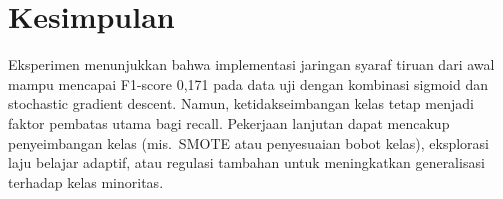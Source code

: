 \documentclass[12pt]{article}
\begin{document}
 
\section*{Kesimpulan}
Eksperimen menunjukkan bahwa implementasi jaringan syaraf tiruan dari awal mampu mencapai F1-score 0,171 pada data uji dengan kombinasi sigmoid dan stochastic gradient descent. Namun, ketidakseimbangan kelas tetap menjadi faktor pembatas utama bagi recall. Pekerjaan lanjutan dapat mencakup penyeimbangan kelas (mis.~SMOTE atau penyesuaian bobot kelas), eksplorasi laju belajar adaptif, atau regulasi tambahan untuk meningkatkan generalisasi terhadap kelas minoritas.
\end{document}
